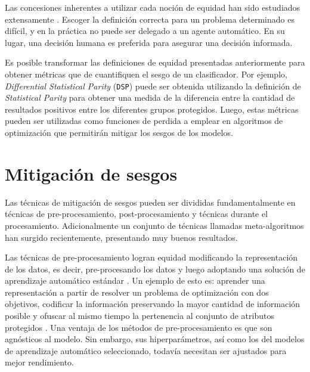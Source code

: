 Las concesiones inherentes a utilizar cada noción de equidad han sido estudiados extensamente \parencite{dwork2012fairness, friedler2016possibility, kleinberg2018inherent}.
Escoger la definición correcta para un problema determinado es difícil, y en la práctica no puede ser delegado a un agente automático.
En su lugar, una decisión humana es preferida para asegurar una decisión informada.

Es posible transformar las definiciones de equidad presentadas anteriormente para obtener métricas que de cuantifiquen el sesgo de un clasificador.
Por ejemplo, \emph{Differential Statistical Parity} (\texttt{DSP}) puede ser obtenida utilizando la definición de \emph{Statistical Parity} para obtener una medida de la diferencia entre la cantidad de resultados positivos entre los diferentes grupos protegidos.
Luego, estas métricas pueden ser utilizadas como funciones de perdida a emplear en algoritmos de optimización que permitirán mitigar los sesgos de los modelos.

\section{Mitigación de sesgos}\label{section:mitigation}


Las técnicas de mitigación de sesgos pueden ser divididas fundamentalmente en técnicas de pre-procesamiento, post-procesamiento y técnicas durante el procesamiento. Adicionalmente un conjunto de técnicas llamadas meta-algoritmos han surgido recientemente, presentando muy buenos resultados.

Las técnicas de pre-procesamiento logran equidad modificando la representación de los datos, es decir, pre-procesando los datos y luego adoptando una solución de aprendizaje automático estándar \parencite{nips2017preproc, Kamiran2011DataPT, zemel2013learning}.
Un ejemplo de esto es: aprender una representación a partir de resolver un problema de optimización con dos objetivos, codificar la información preservando la mayor cantidad de información posible y ofuscar al mismo tiempo la pertenencia al conjunto de atributos protegidos \parencite{zemel2013learning}.
Una ventaja de los métodos de pre-procesamiento es que son agnósticos al modelo.
Sin embargo, sus hiperparámetros, así como los del modelos de aprendizaje automático seleccionado, todavía necesitan ser ajustados para mejor rendimiento.

